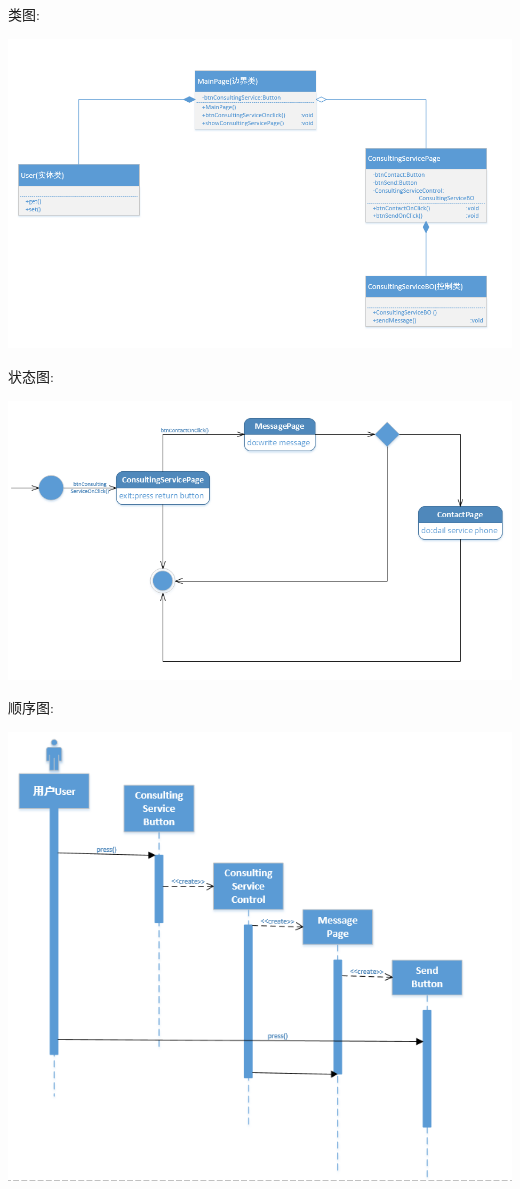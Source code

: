 \documentclass[11pt]{article}
\begin{document}
			类图: 
			\begin{center}
			\includegraphics[scale=0.42]{4.3类图.png}
			\end{center}

			状态图: 
			\begin{center}
			\includegraphics[scale=0.42]{4.3状态图.png}
			\end{center}

			顺序图: 
			\begin{center}
			\includegraphics[scale=0.42]{4.3顺序图.png}
			\end{center}
\end{document}
